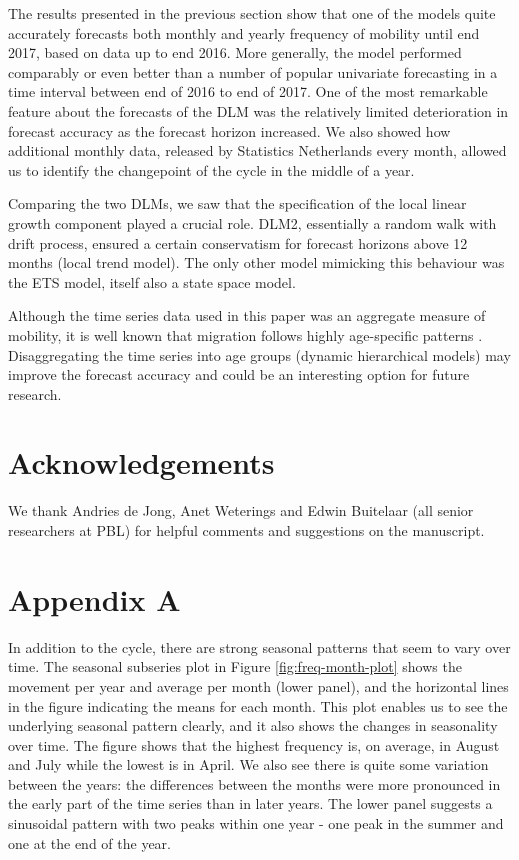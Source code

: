 \documentclass[12pt, a4paper]{article}
\begin{document}
The results presented in the previous section show that one of the models quite accurately forecasts both monthly and yearly frequency of mobility until end 2017, based on data up to end 2016. More generally, the model performed comparably or even better than a number of popular
univariate forecasting in a time interval between end of 2016 to end of
2017. One of the most remarkable feature about the forecasts of the DLM
was the relatively limited deterioration in forecast accuracy as the
forecast horizon increased. We also showed how additional monthly data, released by Statistics Netherlands every month, allowed us to identify the changepoint of the cycle in the middle of a year.

Comparing the two DLMs, we saw that the specification of the local linear growth component played a crucial role. DLM2, essentially a random walk with drift process, ensured a certain conservatism for forecast horizons above 12 months (local trend model). The only other model mimicking
this behaviour was the ETS model, itself also a state space model. 

Although the time series data used in this paper was an aggregate measure of mobility, it is well known that migration follows highly age-specific patterns \citep[e.g., ][]{matthews2013progress, raymer2019spatial}. Disaggregating the time series into age groups (dynamic hierarchical models) may improve the forecast accuracy and could be an interesting option for future research.

\section{Acknowledgements} We thank Andries de Jong, Anet Weterings and Edwin Buitelaar (all senior researchers at PBL) for helpful comments and suggestions on the manuscript. 

\renewcommand\refname{References}
\printbibliography

\section*{Appendix A}\label{appendix-a}

In addition to the cycle, there are strong seasonal patterns that seem
to vary over time. The seasonal subseries plot in Figure
\ref{fig:freq-month-plot} shows the movement per year and average per
month (lower panel), and the horizontal lines in the figure indicating
the means for each month. This plot enables us to see the underlying
seasonal pattern clearly, and it also shows the changes in seasonality
over time. The figure shows that the highest frequency is, on average,
in August and July while the lowest is in April. We also see there is
quite some variation between the years: the differences between the
months were more pronounced in the early part of the time series than in
later years. The lower panel suggests a sinusoidal pattern with two
peaks within one year - one peak in the summer and one at the end of the
year.
\end{document}
